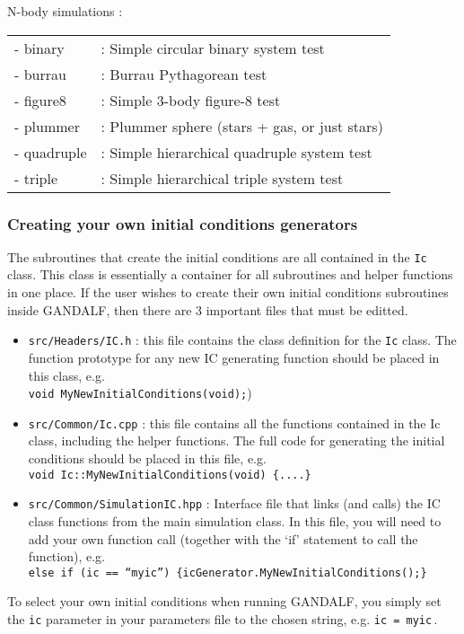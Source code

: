 \documentclass[a4paper]{article}
\newcommand{\var}[1]{\texttt{#1}}
\begin{document}
\noindent N-body simulations : \\
\newline
\begin{tabular}{ll}
- binary    &: Simple circular binary system test \\
- burrau    &: Burrau Pythagorean test \\
- figure8   &: Simple 3-body figure-8 test \\
- plummer   &: Plummer sphere (stars + gas, or just stars) \\
- quadruple &: Simple hierarchical quadruple system test \\
- triple    &: Simple hierarchical triple system test
\end{tabular}
\newline
\newline

\subsubsection{Creating your own initial conditions generators}
The subroutines that create the initial conditions are all contained in the \var{Ic} class.  This class is essentially a container for all subroutines and helper functions in one place.  If the user wishes to create their own initial conditions subroutines inside GANDALF, then there are 3 important files that must be editted.
\begin{itemize}
\item \var{src/Headers/IC.h} : this file contains the class definition for the \var{Ic} class.  The function prototype for any new IC generating function should be placed in this class, e.g. \\
\newline
\var{void MyNewInitialConditions(void);})
\item \var{src/Common/Ic.cpp} : this file contains all the functions contained in the Ic class, including the helper functions.  The full code for generating the initial conditions should be placed in this file, e.g. \\
\newline
\var{void Ic::MyNewInitialConditions(void) \{....\} }
\item \var{src/Common/SimulationIC.hpp} : Interface file that links (and calls) the IC class functions from the main simulation class.  In this file, you will need to add your own function call (together with the `if' statement to call the function), e.g. \\
\newline
\var{else if (ic == ``myic'') \{icGenerator.MyNewInitialConditions();\}}
\end{itemize}
To select your own initial conditions when running GANDALF, you simply set the \var{ic} parameter in your parameters file to the chosen string, e.g. \var{ic = myic}\,.
\end{document}
